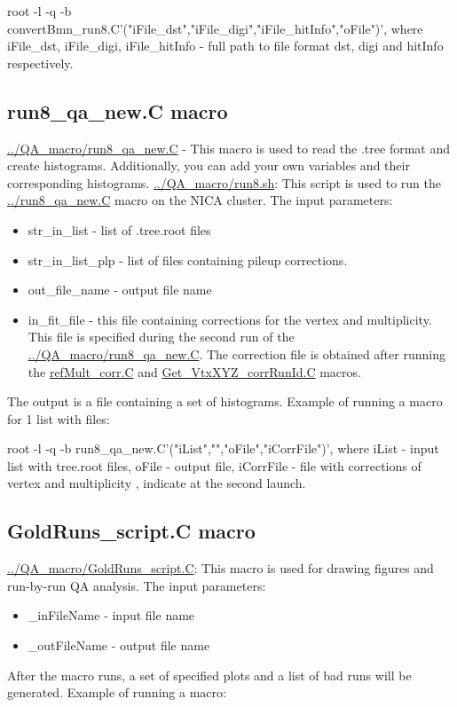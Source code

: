     root -l -q -b convertBmn\_run8.C'("iFile\_dst","iFile\_digi","iFile\_hitInfo","oFile")', 
    where iFile\_dst, iFile\_digi, iFile\_hitInfo - full path to file format dst, digi and hitInfo respectively.  

\subsection{run8\_qa\_new.C macro}\label{qaMacro}

    \url{../QA_macro/run8_qa_new.C} - This macro is used to read the .tree format and create histograms. Additionally, you can add your own variables and their corresponding histograms. \url{../QA_macro/run8.sh}: This script is used to run the  \url{../run8_qa_new.C} macro on the NICA cluster.
    The input parameters:
    \begin{itemize}
        \item str\_in\_list - list of .tree.root files
        \item str\_in\_list\_plp - list of files containing pileup corrections.
        \item out\_file\_name - output file name
        \item in\_fit\_file - this file containing corrections for the vertex and multiplicity. This file is specified during the second run of the \url{../QA_macro/run8_qa_new.C}. The correction file is obtained after running the \url{refMult_corr.C} and \url{Get_VtxXYZ_corrRunId.C} macros.
    \end{itemize}
    The output is a file containing a set of histograms. Example of running a macro for 1 list with files:

    root -l -q -b run8\_qa\_new.C'("iList","","oFile","iCorrFile")', where iList - input list with tree.root files, oFile - output file, iCorrFile - file with corrections of vertex and multiplicity , indicate at the second launch.


\subsection{GoldRuns\_script.C macro}\label{BadRun}
    
    \url{../QA_macro/GoldRuns_script.C}: This macro is used for drawing figures and run-by-run QA analysis.
    The input parameters:
    \begin{itemize}
        \item \_inFileName - input file name
        \item \_outFileName - output file name
    \end{itemize}
    After the macro runs, a set of specified plots and a list of bad runs will be generated.
    Example of running a macro:

